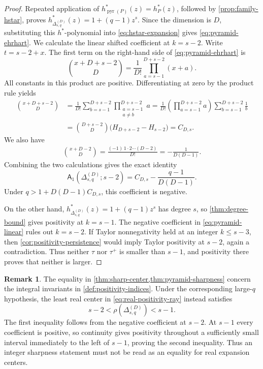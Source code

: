 \documentclass[reqno, 12pt]{article}
\numberwithin{equation}{section}
\theoremstyle{definition}
\newtheorem{remark}[theorem]{Remark}
\newcommand{\A}{\mathsf{A}}
\begin{document}
\begin{proof}
Repeated application of $h_{\operatorname{pyr}(P)}^*(z)=h_P^*(z)$, followed by
\cref{prop:family-hstar}, proves $h_{\Delta_{s,q}^{(D)}}^*(z)=1+(q-1)z^s$.  Since the
dimension is $D$, substituting this $h^*$-polynomial into
\eqref{eq:hstar-expansion} gives \eqref{eq:pyramid-ehrhart}.
We calculate the linear shifted coefficient at $k=s-2$.  Write $t=s-2+x$.  The first term on the right-hand side of
\eqref{eq:pyramid-ehrhart} is
\[\binom{x+D+s-2}{D}=\frac1{D!}\prod_{a=s-1}^{D+s-2}(x+a).
\]
All constants in this product are positive.  Differentiating at zero by the product rule yields
\begin{align*}
 [x]\binom{x+D+s-2}{D}&=\frac1{D!}\sum_{b=s-1}^{D+s-2}\prod_{\substack{a=s-1\\a\ne b}}^{D+s-2}a
 =\frac1{D!}\left(\prod_{a=s-1}^{D+s-2}a\right)\sum_{b=s-1}^{D+s-2}\frac1b\\
 &=\binom{D+s-2}{D}\bigl(H_{D+s-2}-H_{s-2}\bigr)=C_{D,s}.
\end{align*}
We also have 
\begin{align*}
[x]\binom{x+D-2}{D}=\frac{(-1)\,1\cdot2\cdots(D-2)}{D!}=-\frac1{D(D-1)}.
\end{align*}
Combining the two calculations gives the exact identity
\begin{equation}\label{eq:pyramid-linear}
 \A_1(\Delta_{s,q}^{(D)};s-2)=C_{D,s}-\frac{q-1}{D(D-1)}.
\end{equation}
Under $q>1+D(D-1)C_{D,s}$, this coefficient is negative.

On the other hand, $h_{\Delta_{s,q}^{(D)}}^*(z)=1+(q-1)z^s$ has degree $s$, so \cref{thm:degree-bound} gives positivity at $k=s-1$. 
The negative coefficient in \eqref{eq:pyramid-linear} rules out $k=s-2$. If Taylor nonnegativity held at an integer $k\leq s-3$, then \cref{cor:positivity-persistence} would imply Taylor positivity at $s-2$, again a contradiction.
Thus neither $\tau$ nor $\tau^+$ is smaller than $s-1$, and positivity there proves that neither is larger.
\end{proof}

\begin{remark}\label{rem:real-sharpness}
The equality in \cref{thm:sharp-center,thm:pyramid-sharpness} concern the integral invariants in \cref{def:positivity-indices}.  Under the corresponding large-$q$ hypothesis, the least real center in \eqref{eq:real-positivity-ray} instead satisfies
\[ s-2<\rho(\Delta_{s,q}^{(D)})<s-1.
\]
The first inequality follows from the negative coefficient at $s-2$.  At $s-1$ every coefficient is positive, so continuity gives positivity throughout a sufficiently small interval immediately to the left of $s-1$, proving the second inequality.  Thus an integer sharpness statement must not be read as an equality for real expansion centers.
\end{remark}
\end{document}
